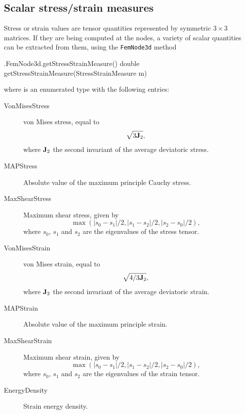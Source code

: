 \subsection{Scalar stress/strain measures}
\label{ScalarStressStrainMeasures:sec}

Stress or strain values are tensor quantities represented by symmetric
$3 \times 3$ matrices. If they are being computed at the nodes, a
variety of scalar quantities can be extracted from them, using the
{\tt FemNode3d} method
%
\begin{methodtable}{0.45}{0.55}
%
\methodentry
{\fem.FemNode3d.getStressStrainMeasure()}%
{double getStressStrainMeasure(StressStrainMeasure m)}%
{}%
%
\end{methodtable}
%
where 
 is 
an enumerated type with the following entries:

\begin{description}

\item[VonMisesStress]\mbox{}

von Mises stress, equal to
%
\begin{equation*}
\sqrt{3 {\bf J}_2},
\end{equation*}
%
where ${\bf J}_2$ the second invariant of the average deviatoric stress.

\item[MAPStress]\mbox{}

Absolute value of the maximum principle Cauchy stress.

\item[MaxShearStress]\mbox{}

Maximum shear stress, given by
%
\begin{equation*}
\max (|s_0-s_1|/2, |s_1-s_2|/2, |s_2-s_0|/2),
\end{equation*}
%
where $s_0$, $s_1$ and $s_2$ are the eigenvalues of the stress tensor.

\item[VonMisesStrain]\mbox{}

von Mises strain, equal to
%
\begin{equation*}
\sqrt{4/3 {\bf J}_2},
\end{equation*}
%
where ${\bf J}_2$ the second invariant of the average deviatoric strain.

\item[MAPStrain]\mbox{}

Absolute value of the maximum principle strain.

\item[MaxShearStrain]\mbox{}

Maximum shear strain, given by
%
\begin{equation*}
\max (|s_0-s_1|/2, |s_1-s_2|/2, |s_2-s_0|/2),
\end{equation*}
%
where $s_0$, $s_1$ and $s_2$ are the eigenvalues of the strain tensor.

\item[EnergyDensity]\mbox{}

Strain energy density.

\end{description}

